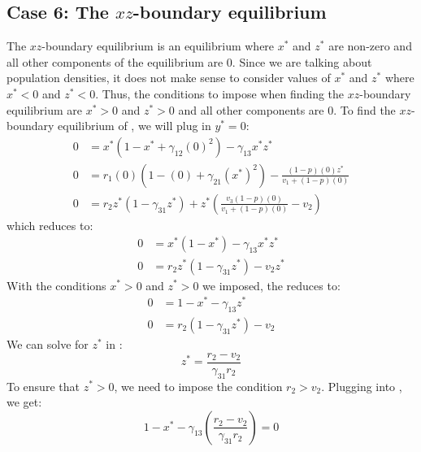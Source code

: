 \subsection{Case 6: The $xz$-boundary equilibrium}\label{subsec:xz_boundary_equilibrium}
The $xz$-boundary equilibrium is an equilibrium where $x^*$ and $z^*$ are non-zero and all other components of the equilibrium are 0. Since we are talking about population densities, it does not make sense to consider values of $x^*$ and $z^*$ where $x^*<0$ and $z^*<0$. Thus, the conditions to impose when finding the $xz$-boundary equilibrium are $x^*>0$ and $z^*>0$ and all other components are 0. To find the $xz$-boundary equilibrium of , we will plug in $y^*=0$:
\begin{align*}
    0 &= x^*\left(1-x^*+\gamma_{12}(0)^2\right)-\gamma_{13}x^*z^*\\
    0 &= r_1(0)\left(1-(0)+\gamma_{21}\left(x^*\right)^2\right)-\frac{\left(1-p\right)(0)z^*}{v_1+\left(1-p\right)(0)}\\
    0 &= r_2z^*\left(1-\gamma_{31}z^*\right)+z^*\left(\frac{v_3\left(1-p\right)(0)}{v_1+\left(1-p\right)(0)}-v_2\right)
\end{align*}
which reduces to:
\begin{subequations}
    \begin{align}
        0 &= x^*\left(1-x^*\right)-\gamma_{13}x^*z^*
        \label{eq:4.9a}\\
        0 &= r_2z^*\left(1-\gamma_{31}z^*\right)-v_2z^*
        \label{eq:4.9b}
    \end{align}
    \label{eq:4.9}
\end{subequations}
With the conditions $x^*>0$ and $z^*>0$ we imposed, the  reduces to:
\begin{subequations}
    \begin{align}
        0 &= 1-x^*-\gamma_{13}z^*
        \label{eq:4.10a}\\
        0 &= r_2\left(1-\gamma_{31}z^*\right)-v_2
        \label{eq:4.10b}
    \end{align}
    \label{eq:4.10}
\end{subequations}
We can solve for $z^*$ in :
\begin{equation}
    z^*=\frac{r_2-v_2}{\gamma_{31}r_2}
    \label{eq:4.11}
\end{equation}
To ensure that $z^*>0$, we need to impose the condition $r_2>v_2$. Plugging  into , we get:
\begin{equation}
    1-x^*-\gamma_{13}\left(\frac{r_2-v_2}{\gamma_{31}r_2}\right)=0
    \label{eq:4.12}
\end{equation}
